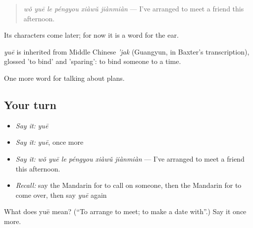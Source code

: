 \begin{quote}
\emph{wǒ yuē le péngyou xiàwǔ jiànmiàn} — I've arranged to meet a friend this afternoon.
\end{quote}

Its characters come later; for now it is a word for the ear.

\begin{cousinweb}
\emph{yuē} is inherited from Middle Chinese \emph{'jak} (Guangyun, in Baxter's transcription), glossed 'to bind' and 'sparing': to bind someone to a time.
\end{cousinweb}

\begin{grammarlens}[title={What you've built}]
One more word for talking about plans.
\end{grammarlens}

\subsection*{Your turn}
\begin{itemize}
\raggedright
  \item \emph{Say it:} \emph{yuē}
  \item \emph{Say it:} \emph{yuē}, once more
  \item \emph{Say it:} \emph{wǒ yuē le péngyou xiàwǔ jiànmiàn} — I've arranged to meet a friend this afternoon.
  \item \emph{Recall:} say the Mandarin for to call on someone, then the Mandarin for to come over, then say \emph{yuē} again
\end{itemize}

\begin{tcolorbox}[breakable,colback=teal!4,colframe=teal!35!black,title={Before you move on}]
What does yuē mean? (\textquotedblleft{}To arrange to meet; to make a date with\textquotedblright{}.) Say it once more.
\end{tcolorbox}
